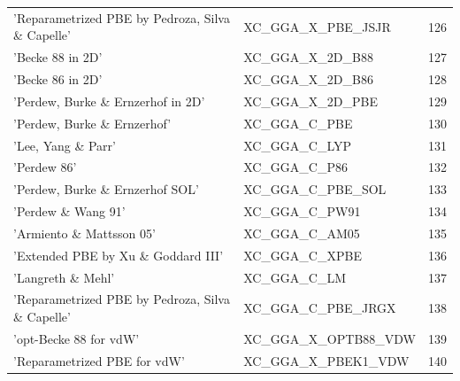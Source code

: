 \documentclass[final,12pt]{article}
\begin{document}
{{{{{{\begin{table}[!h]
\begin{center}
\begin{tabular}{llr}
  'Reparametrized PBE by Pedroza, Silva \& Capelle' & XC\_GGA\_X\_PBE\_JSJR  &126\\
  'Becke 88 in 2D' & XC\_GGA\_X\_2D\_B88  &127\\
  'Becke 86 in 2D' & XC\_GGA\_X\_2D\_B86  &128\\
  'Perdew, Burke \& Ernzerhof in 2D' & XC\_GGA\_X\_2D\_PBE  &129\\
  'Perdew, Burke \& Ernzerhof' & XC\_GGA\_C\_PBE  &130\\
  'Lee, Yang \& Parr' & XC\_GGA\_C\_LYP  &131\\
  'Perdew 86' & XC\_GGA\_C\_P86  &132\\
  'Perdew, Burke \& Ernzerhof SOL' & XC\_GGA\_C\_PBE\_SOL  &133\\
  'Perdew \& Wang 91' & XC\_GGA\_C\_PW91  &134\\
  'Armiento \& Mattsson 05' & XC\_GGA\_C\_AM05  &135\\
  'Extended PBE by Xu \& Goddard III' & XC\_GGA\_C\_XPBE  &136\\
  'Langreth \& Mehl' & XC\_GGA\_C\_LM  &137\\
  'Reparametrized PBE by Pedroza, Silva \& Capelle' & XC\_GGA\_C\_PBE\_JRGX  &138\\
  'opt-Becke 88 for vdW' & XC\_GGA\_X\_OPTB88\_VDW  &139\\
  'Reparametrized PBE for vdW' & XC\_GGA\_X\_PBEK1\_VDW  &140\\
\hline
\hline
\end{tabular}
\end{center}
\end{table}

}}}}}}
\end{document}
